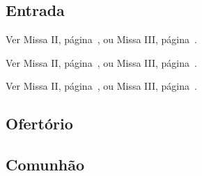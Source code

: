 
\subsection{Entrada}\label{subsection:tempus-per-annum/missa-6/introitus}
\def\AntiphonAnnotation{\CantusID{002090}}
\def\AntiphonScore{da-pacem-domine.2D/}

\begin{rubrica}
  Ver Missa II, página~\pageref{subsection:tempus-per-annum/missa-2/psalmus-responsorius}, ou Missa III, página~\pageref{subsection:tempus-per-annum/missa-3/psalmus-responsorius}.
\end{rubrica}

\begin{rubrica}
  Ver Missa II, página~\pageref{subsection:tempus-per-annum/missa-2/alleluia}, ou Missa III, página~\pageref{subsection:tempus-per-annum/missa-3/alleluia}.
\end{rubrica}

\begin{rubrica}
  Ver Missa II, página~\pageref{subsection:tempus-per-annum/missa-2/psalmus-alleluiaticus}, ou Missa III, página~\pageref{subsection:tempus-per-annum/missa-3/psalmus-alleluiaticus}.
\end{rubrica}

\AllowPageFlush

\subsection{Ofertório}\label{subsection:tempus-per-annum/missa-6/offertorium}
\def\AntiphonAnnotation{\CantusID{001735}[Sl 125(124),4]}
\def\AntiphonScore{benefac-domine.8c/}

\AllowPageFlush

\subsection{Comunhão}\label{subsection:tempus-per-annum/missa-6/communio}
\def\AntiphonAnnotation{\CantusID{001281}[Sl 119(118),117]}
\def\AntiphonScore{adiuva-me.8G/}
